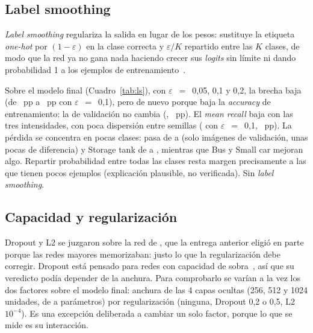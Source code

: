 \begin{table}[h]
  \centering
  \caption{Cambios sobre el modelo con BatchNorm y rotaciones de 90$^\circ$ ( semillas por fila).}
  \label{tab:combine}
\end{table}

\subsection{Label smoothing}
\emph{Label smoothing} regulariza la salida en lugar de los pesos: sustituye la etiqueta \emph{one-hot} por
$(1-\varepsilon)$ en la clase correcta y $\varepsilon/K$ repartido entre las $K$ clases, de modo que la red ya no gana
nada haciendo crecer sus \emph{logits} sin límite ni dando probabilidad 1 a los ejemplos de
entrenamiento~\cite{szegedy,muller}.

{Sobre el modelo final (Cuadro~\ref{tab:ls}), con $\varepsilon$~$=$~0,05, 0,1 y 0,2, la brecha baja (de
~pp a ~pp con $\varepsilon$~$=$~0,1), pero de nuevo porque baja la
\emph{accuracy} de entrenamiento: la de validación no cambia (, ~pp).}
{El \emph{mean recall} baja con las tres intensidades, con poca dispersión entre semillas (
con $\varepsilon$~$=$~0,1, ~pp). La pérdida se concentra en pocas clases:  pasa de
 a  (solo  imágenes de validación, unas
pocas de diferencia) y Storage tank de  a , mientras
que Bus y Small car mejoran algo. Repartir probabilidad entre todas las clases resta margen precisamente a las que
tienen pocos ejemplos (explicación plausible, no verificada).}
{Sin \emph{label smoothing}.}

\begin{table}[h]
  \centering
  \caption{\emph{Label smoothing} sobre el modelo final ( semillas por fila).}
  \label{tab:ls}
\end{table}

\subsection{Capacidad y regularización}\label{sec:capacity}
Dropout y L2 se juzgaron sobre la red de , que la entrega anterior eligió en parte porque las redes
mayores memorizaban: justo lo que la regularización debe corregir. Dropout está pensado para redes con capacidad de
sobra~\cite{srivastava}, así que su veredicto podía depender de la anchura. Para comprobarlo se varían a la vez los
dos factores sobre el modelo final: anchura de las 4 capas ocultas (256, 512 y 1024 unidades, de
 a  parámetros) por regularización (ninguna, Dropout 0,2 o 0,5, L2
$10^{-4}$). Es una excepción deliberada a cambiar un solo factor, porque lo que se mide es su interacción.

